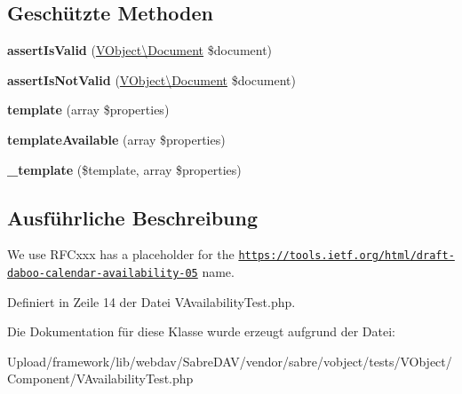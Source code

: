 \subsection*{Geschützte Methoden}
\begin{DoxyCompactItemize}
\item 
\mbox{\label{class_sabre_1_1_v_object_1_1_component_1_1_v_availability_test_ad7de19942e589a9b06d4542e046b59dc}} 
{\bfseries assert\+Is\+Valid} (\mbox{\hyperlink{class_sabre_1_1_v_object_1_1_document}{V\+Object\textbackslash{}\+Document}} \$document)
\item 
\mbox{\label{class_sabre_1_1_v_object_1_1_component_1_1_v_availability_test_a0f5b2858607a44c3b8bf4a4449e3d030}} 
{\bfseries assert\+Is\+Not\+Valid} (\mbox{\hyperlink{class_sabre_1_1_v_object_1_1_document}{V\+Object\textbackslash{}\+Document}} \$document)
\item 
\mbox{\label{class_sabre_1_1_v_object_1_1_component_1_1_v_availability_test_a5c6cc35ac308dcab14d43db493140d73}} 
{\bfseries template} (array \$properties)
\item 
\mbox{\label{class_sabre_1_1_v_object_1_1_component_1_1_v_availability_test_a13e28fb097dfd2d548d36fc30abaedfd}} 
{\bfseries template\+Available} (array \$properties)
\item 
\mbox{\label{class_sabre_1_1_v_object_1_1_component_1_1_v_availability_test_a285c5844066b0fd7df2293bda7c8901b}} 
{\bfseries \+\_\+template} (\$template, array \$properties)
\end{DoxyCompactItemize}


\subsection{Ausführliche Beschreibung}
We use {\ttfamily R\+F\+Cxxx} has a placeholder for the \href{https://tools.ietf.org/html/draft-daboo-calendar-availability-05}{\tt https\+://tools.\+ietf.\+org/html/draft-\/daboo-\/calendar-\/availability-\/05} name. 

Definiert in Zeile 14 der Datei V\+Availability\+Test.\+php.



Die Dokumentation für diese Klasse wurde erzeugt aufgrund der Datei\+:\begin{DoxyCompactItemize}
\item 
Upload/framework/lib/webdav/\+Sabre\+D\+A\+V/vendor/sabre/vobject/tests/\+V\+Object/\+Component/V\+Availability\+Test.\+php\end{DoxyCompactItemize}
